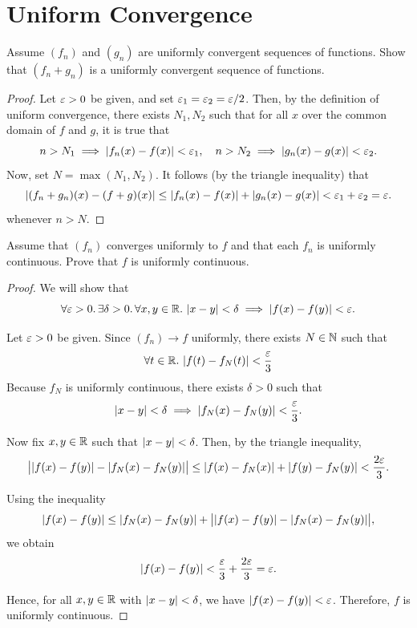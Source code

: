 \section{Uniform Convergence}

\begin{problem}
  Assume $(f_{n})$ and $(g_{n})$ are uniformly convergent sequences of
  functions. Show that $(f_{n} + g_{n})$ is a uniformly convergent sequence of
  functions.

  \begin{proof}
    Let $\varepsilon > 0$ be given, and set $\varepsilon_{1} = \varepsilon_{2} = \varepsilon/2$. Then, by
    the definition of uniform convergence, there exists $N_{1}, N_{2}$ such
    that for all $x$ over the common domain of $f$  and $g$, it is true that
    \[
      n > N_{1} \implies \left\lvert  f_{n}(x) - f(x)  \right\rvert < \varepsilon_{1}, \quad n > N_{2} \implies \left\lvert  g_{n}(x) - g(x)  \right\rvert < \varepsilon_{2}.
    \]
    Now, set $N = \max(N_{1}, N_{2})$. It follows (by the triangle inequality) that
    \[
      \left\lvert  (f_{n} + g_{n})(x) - (f + g)(x)  \right\rvert \leq \left\lvert  f_{n}(x) - f(x)  \right\rvert + \left\lvert  g_{n}(x) - g(x)  \right\rvert < \varepsilon_{1} + \varepsilon_{2} = \varepsilon.
    \]
    whenever $n > N$.
  \end{proof}

\end{problem}

\begin{problem}
  Assume that $(f_{n})$ converges uniformly to $f$ and that each $f_{n}$ is
  uniformly continuous. Prove that $f$ is uniformly continuous.

  \begin{proof}
    We will show that
    \[
      \forall \varepsilon > 0.\, \exists \delta > 0.\, \forall x, y \in \mathbb{R}.\, \left\lvert x - y \right\rvert < \delta \implies \left\lvert f(x) - f(y) \right\rvert < \varepsilon.
    \]

    Let $\varepsilon > 0$ be given. Since $(f_{n}) \to f$ uniformly, there exists $N \in \mathbb{N}$ such that
    \[
      \forall t \in \mathbb{R}.\, \left\lvert f(t) - f_N(t) \right\rvert < \frac{\varepsilon}{3} 
    \]
    Because $f_{N}$ is uniformly continuous, there exists $\delta > 0$ such that
    \[
      \left\lvert x - y \right\rvert < \delta \implies |f_N(x) - f_N(y)| < \frac{\varepsilon}{3}.
    \]

    Now fix $x,y \in \mathbb{R}$ such that $\left\lvert  x - y  \right\rvert< \delta$. Then, by the triangle inequality,
    \[
      \bigl| \left\lvert  f(x)-f(y)  \right\rvert - \left\lvert  f_N(x) - f_N(y)  \right\rvert \bigr| \leq \left\lvert  f(x) - f_N(x)  \right\rvert + \left\lvert  f(y) - f_N(y)  \right\rvert < \frac{2\varepsilon}{3}.
    \]

    Using the inequality
    \[
      \left\lvert  f(x) - f(y)  \right\rvert \leq \left\lvert  f_N(x) - f_N(y)  \right\rvert
      + \bigl| \left\lvert  f(x) - f(y)  \right\rvert - \left\lvert  f_N(x) - f_N(y)  \right\rvert \bigr|,
    \]
    we obtain
    \[
      \left\lvert  f(x) - f(y)  \right\rvert
      < \frac{\varepsilon}{3} + \frac{2\varepsilon}{3}
      = \varepsilon.
    \]

    Hence, for all $x,y \in \mathbb{R}$ with $\left\lvert  x - y  \right\rvert < \delta$, we have $\left\lvert  f(x) - f(y)  \right\rvert< \varepsilon$.
    Therefore, $f$ is uniformly continuous.
  \end{proof}

\end{problem}

